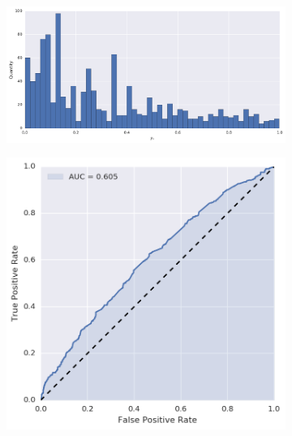 \begin{figure}[!h]
\centering
\begin{subfigure}[t]{\textwidth}
	\centering
	\includegraphics[height=.175\textheight]{figures/bayes/least1/hist_sms.png}
\end{subfigure}
\begin{subfigure}[b]{.49\textwidth}
	\raggedleft{}
	\includegraphics[height=.175\textheight]{figures/bayes/least1/roc_sms.png}
\end{subfigure}
\begin{subfigure}[b]{.49\textwidth}
	\raggedright{}

\end{subfigure}
\end{figure}
